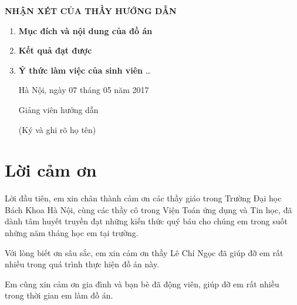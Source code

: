 \documentclass[14pt, oneside, a4paper, openany]{scrartcl}
\begin{document}
\newpage
\thispagestyle{empty}
\centerline{\Large\bf NHẬN XÉT CỦA THẦY HƯỚNG DẪN}
\begin{enumerate}
	\item \textbf{Mục đích và nội dung của đồ án}
	\newline
	\newline
	\newline
	\newline
	\item \textbf{Kết quả đạt được}
	\newline
	\newline
	\newline
	\newline
	\item \textbf{Ý thức làm việc của sinh viên} \ldots
	\newline
	\newline
	\newline
	\newline
	\newline
	
	\begin{flushright}
		Hà Nội, ngày 07 tháng 05 năm 2017
	\end{flushright}
	\hspace{95 mm}Giảng viên hướng dẫn
	
	\hspace{95 mm}(Ký và ghi rõ họ tên)
\end{enumerate}

\newpage
\thispagestyle{empty}
\tableofcontents
\newpage
\thispagestyle{empty}
\listoffigures
\newpage
\thispagestyle{empty}
\listoftables
\newpage
\thispagestyle{empty}
\listofalgorithms
{}
\newpage
\section{Lời cảm ơn}
Lời đầu tiên, em xin chân thành cảm ơn các thầy giáo trong Trường Đại học Bách Khoa Hà Nội, cùng các thầy cô trong Viện Toán ứng dụng và Tin học, đã dành tâm huyết truyền đạt những kiến thức quý báu cho chúng em trong suốt những năm tháng học em tại trường.

Với lòng biết ơn sâu sắc, em xin cảm ơn thầy Lê Chí Ngọc đã giúp đỡ em rất nhiều trong quá trình thực hiện đồ án này.

Em cũng xin cảm ơn gia đình và bạn bè đã động viên, giúp đỡ em rất nhiều trong thời gian em làm đồ án.
\end{document}
